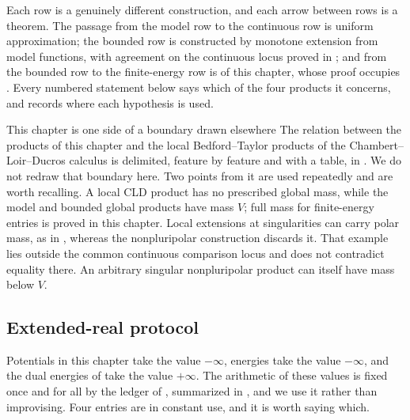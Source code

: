 Each row is a genuinely different construction, and each arrow between rows is
a theorem.  The passage from the model row to the continuous row is uniform
approximation; the bounded row is constructed by monotone extension from model functions,
with agreement on the continuous locus proved in
; and from the bounded row to the
finite-energy row is  of this chapter, whose proof
occupies .  Every numbered statement below says
which of the four products it concerns, and  records
where each hypothesis is used.

\begin{warning}{This chapter is one side of a boundary drawn elsewhere}
The relation between the products of this chapter and the local
Bedford--Taylor products of the Chambert--Loir--Ducros calculus is delimited,
feature by feature and with a table, in
.  We do not redraw
that boundary here.  Two points from it are used repeatedly and are worth
recalling.  A local CLD product has no prescribed global mass, while the
model and bounded global products have mass $V$; full mass for finite-energy
entries is proved in this chapter.  Local extensions at singularities can
carry polar mass, as in , whereas the
nonpluripolar construction discards it.  That example lies outside the common
continuous comparison locus and does not contradict equality there.
An arbitrary singular nonpluripolar product can itself have mass below $V$.
\end{warning}

\subsection{Extended-real protocol}
\label{sec:ch26-extended-real}

Potentials in this chapter take the value $-\infty$, energies take the value
$-\infty$, and the dual energies of
 take the value $+\infty$.  The
arithmetic of these values is fixed once and for all by the ledger of
, summarized in
, and we use it rather than improvising.  Four
entries are in constant use, and it is worth saying which.

